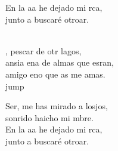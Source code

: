 \begin{cancion}
\begin{chorus}
	En la aa he dejado mi rca,\\
	junto a  buscaré otroar.\\
	\end{chorus}%
	\jump\\
	, pescar de otr lagos, \\
	ansia ena de almas que esran,\\
	amigo eno que as me amas.\\jump\\
	\begin{chorus}%
	Ser, me has mirado a losjos,\\
	sonrido haicho mi mbre.\\
	En la aa he dejado mi rca,\\
	junto a  buscaré otroar.\\
	\end{chorus}%
	\jump\\
\end{cancion}%
